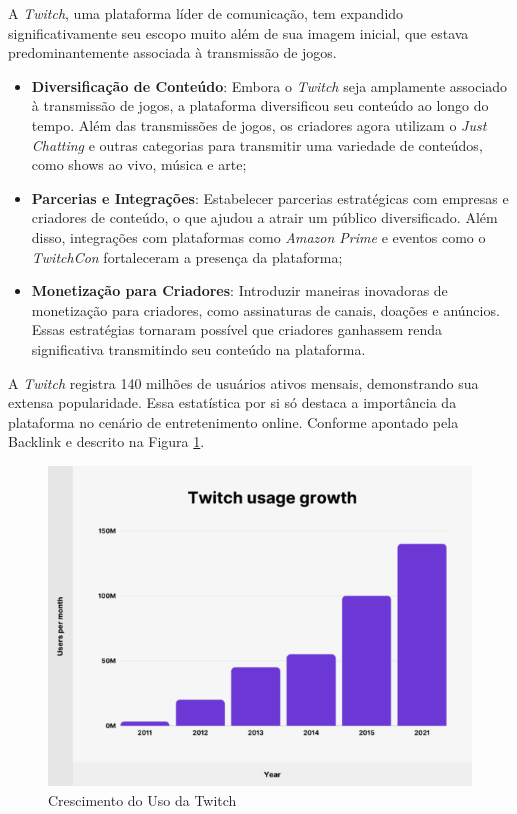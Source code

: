 A \textit{\gls{Twitch}}, uma plataforma líder de comunicação, tem expandido significativamente seu escopo muito além de sua imagem inicial, que estava predominantemente associada à transmissão de jogos.

\begin{itemize}
    \item \textbf{Diversificação de Conteúdo}: Embora o \textit{\gls{Twitch}} seja amplamente associado à transmissão de jogos, a plataforma diversificou seu conteúdo ao longo do tempo. Além das transmissões de jogos, os criadores agora utilizam o \textit{Just Chatting} e outras categorias para transmitir uma variedade de conteúdos, como shows ao vivo, música e arte;
    \item \textbf{Parcerias e Integrações}: Estabelecer parcerias estratégicas com empresas e criadores de conteúdo, o que ajudou a atrair um público diversificado. Além disso, integrações com plataformas como \textit{\gls{Amazon Prime}} e eventos como o \textit{TwitchCon} fortaleceram a presença da plataforma;
    \item \textbf{Monetização para Criadores}: Introduzir maneiras inovadoras de monetização para criadores, como assinaturas de canais, doações e anúncios. Essas estratégias tornaram possível que criadores ganhassem renda significativa transmitindo seu conteúdo na plataforma.
\end{itemize}


A \textit{\gls{Twitch}} registra 140 milhões de usuários ativos mensais, demonstrando sua extensa popularidade. Essa estatística por si só destaca a importância da plataforma no cenário de entretenimento online. Conforme apontado pela Backlink \cite{twitch_growth_statistics} e descrito na Figura \ref{crescimentoUsoTwitch}.

\begin{figure}[H]
    \center
	\caption{\label{fig_sge20}Crescimento do Uso da Twitch}
    \label{crescimentoUsoTwitch}
    \includegraphics[scale=0.85]{imagens/viabilidadeFinanceira/CrescimentoTwitch.png}
\end{figure}

